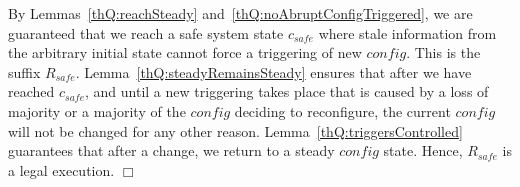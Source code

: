 \documentclass[11pt]{article}
\newcommand{\remove}[1]{}
\newtheorem{theorem}{Theorem}[section]
\newenvironment{proof}{\noindent{\bf Proof.}}{\hfill$\Box$}
\begin{document}
\begin{proof}
By Lemmas~\ref{thQ:reachSteady} and~\ref{thQ:noAbruptConfigTriggered}, we are guaranteed that we reach a safe system state $c_{safe}$ where stale information from the arbitrary initial state cannot force a triggering of new $config$.
This is the suffix $R_{safe}$.
Lemma~\ref{thQ:steadyRemainsSteady} ensures that after we have reached $c_{safe}$, and until a new triggering takes place that is caused by a loss of majority or a majority of the $config$ deciding to reconfigure, the current $config$ will not be changed for any other reason.
Lemma~\ref{thQ:triggersControlled} guarantees that after a change, we return to a steady $config$ state.
Hence, $R_{safe}$ is a legal execution.
\end{proof}





















\remove{
A \emph{legal execution} $R$ of Algorithm~\ref{alg:SSQR}, refers to an execution composed by steady $config$ states and delicate configurations triggered due to loss of majority of configuration members, or due to the need of the majority of the members to reconfigure. 
The following lemmas give the outline of the proof, leading to the proof of Theorem~\ref{thm:corrupper}. The omitted details and proofs can be found in Appendix~\ref{app:upper}.\vspace{-.5em}



\begin{theorem}
\label{thm:corrupper}
Let $R$ be an execution of Algorithm~\ref{alg:SSQR} starting from an arbitrary system state. $R$ reaches a legal execution.\vspace{-1em}
\end{theorem}

}
\end{document}
